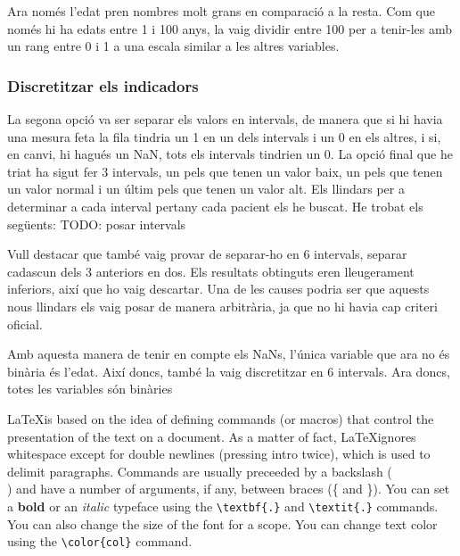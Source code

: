 \documentclass[9pt,a4paper,twoside]{tau-class/tau}
\begin{document}
    Ara només l'edat pren nombres molt grans en comparació a la resta. Com que només hi ha edats entre 1 i 100 anys, la vaig dividir entre 100 per a tenir-les amb un rang entre 0 i 1 a una escala similar a les altres variables.

    \subsubsection{Discretitzar els indicadors}
    La segona opció va ser separar els valors en intervals, de manera que si hi havia una mesura feta la fila tindria un 1 en un dels intervals i un 0 en els altres, i si, en canvi, hi hagués un NaN, tots els intervals tindrien un 0. La opció final que he triat ha sigut fer 3 intervals, un pels que tenen un valor baix, un pels que tenen un valor normal i un últim pels que tenen un valor alt. Els llindars per a determinar a cada interval pertany cada pacient els he buscat. He trobat els següents:
    TODO: posar intervals

    Vull destacar que també vaig provar de separar-ho en 6 intervals, separar cadascun dels 3 anteriors en dos. Els resultats obtinguts eren lleugerament inferiors, així que ho vaig descartar. Una de les causes podria ser que aquests nous llindars els vaig posar de manera arbitrària, ja que no hi havia cap criteri oficial.

    Amb aquesta manera de tenir en compte els NaNs, l'única variable que ara no és binària és l'edat. Així doncs, també la vaig discretitzar en 6 intervals. Ara doncs, totes les variables són binàries
    

    \LaTeX is based on the idea of defining commands (or macros) that control the presentation of the text on a document. As a matter of fact, \LaTeX ignores whitespace except for double newlines (pressing intro twice), which is used to delimit paragraphs. Commands are usually preceeded by a backslash (\\) and have a number of arguments, if any, between braces (\{ and \}). You can set a \textbf{bold} or an \textit{italic} typeface using the \verb|\textbf{.}| and \verb|\textit{.}| commands. You can also {\tiny change the size of the font for a scope}. You can change {\color{red} text color} using the \verb|\color{col}| command. 
\end{document}
